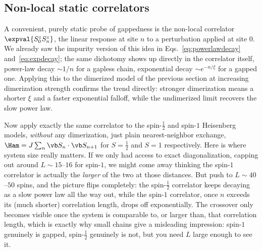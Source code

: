 \documentclass[all_sessions.tex]{subfiles}
\begin{document}
\subsection{Non-local static correlators}
A convenient, purely static probe of gappedness is the non-local correlator
$\expval{S_0^z S_n^z}$, the linear response at site $n$ to a perturbation applied at site $0$. We
already saw the impurity version of this idea in Eqs.~\eqref{eq:powerlawdecay}
and~\eqref{eq:expdecay}; the same dichotomy shows up directly in the correlator itself, power-law
decay $\sim 1/n$ for a gapless chain, exponential decay $\sim e^{-n/\xi}$ for a gapped one. Applying
this to the dimerized model of the previous section at increasing dimerization strength confirms
the trend directly: stronger dimerization means a shorter $\xi$ and a faster exponential falloff,
while the undimerized limit recovers the slow power law.

Now apply exactly the same correlator to the spin-$\tfrac12$ and spin-$1$ Heisenberg models,
\emph{without} any dimerization, just plain nearest-neighbor exchange, $\Ham =
J\sum_n \vb S_n\cdot\vb S_{n+1}$ for $S=\tfrac12$ and $S=1$ respectively. Here is where system size
really matters. If we only had access to exact diagonalization, capping out around $L\sim15$--$16$
for spin-$1$, we might come away thinking the spin-$1$ correlator is actually the \emph{larger} of
the two at those distances. But push to $L\sim 40$--$50$ spins, and the picture flips completely:
the spin-$\tfrac12$ correlator keeps decaying as a slow power law all the way out, while the spin-$1$
correlator, once $n$ exceeds its (much shorter) correlation length, drops off exponentially. The
crossover only becomes visible once the system is comparable to, or larger than, that correlation
length, which is exactly why small chains give a misleading impression: spin-$1$ genuinely is
gapped, spin-$\tfrac12$ genuinely is not, but you need $L$ large enough to see it.
\end{document}
